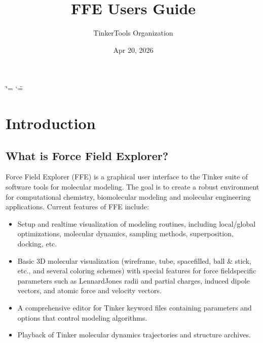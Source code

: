 \documentclass[letterpaper,11pt,english]{sphinxmanual}
\title{FFE User\textquotesingle{}s Guide}
\date{Apr 20, 2026}
\author{TinkerTools Organization}
\begin{document}
\ifdefined\shorthandoff
  \ifnum\catcode`\=\string=\active\shorthandoff{=}\fi
  \ifnum\catcode`\"=\active{}\fi
\fi

\pagestyle{empty}
\sphinxmaketitle
\pagestyle{plain}
\sphinxtableofcontents
\pagestyle{normal}
\label{\detokenize{index::doc}}


\sphinxstepscope


\chapter{Introduction}
\label{\detokenize{text/introduction:introduction}}\label{\detokenize{text/introduction::doc}}

\section{What is Force Field Explorer?}
\label{\detokenize{text/introduction:what-is-force-field-explorer}}
\sphinxAtStartPar
Force Field Explorer (FFE) is a graphical user interface to the Tinker suite of software tools for molecular modeling. The goal is to create a robust environment for computational chemistry, biomolecular modeling and molecular engineering applications. Current features of FFE include:
\begin{itemize}
\item {} 
\sphinxAtStartPar
Setup and real\sphinxhyphen{}time visualization of modeling routines, including local/global optimizations, molecular dynamics, sampling methods, superposition, docking, etc.

\item {} 
\sphinxAtStartPar
Basic 3D molecular visualization (wireframe, tube, spacefilled, ball \& stick, etc., and several coloring schemes) with special features for force field\sphinxhyphen{}specific parameters such as Lennard\sphinxhyphen{}Jones radii and partial charges, induced dipole vectors, and atomic force and velocity vectors.

\item {} 
\sphinxAtStartPar
A comprehensive editor for Tinker keyword files containing parameters and options that control modeling algorithms.

\item {} 
\sphinxAtStartPar
Playback of Tinker molecular dynamics trajectories and structure archives.

\end{itemize}
\end{document}
